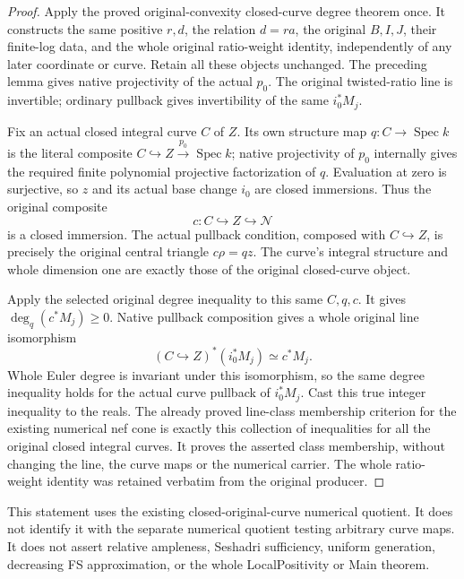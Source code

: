 \begin{proof}
Apply the proved original-convexity closed-curve degree theorem once.
It constructs the same positive $r,d$, the relation $d=ra$, the original
$B,I,J$, their finite-log data, and the whole original ratio-weight
identity, independently of any later coordinate or curve.  Retain all
these objects unchanged.  The preceding lemma gives native projectivity
of the actual $p_0$.  The original twisted-ratio line is invertible;
ordinary pullback gives invertibility of the same $i_0^*M_j$.

Fix an actual closed integral curve $C$ of $Z$.  Its own structure map
$q:C\to\operatorname{Spec}k$ is the literal composite $C\hookrightarrow
Z\xrightarrow{p_0}\operatorname{Spec}k$; native projectivity of $p_0$
internally gives the required finite polynomial projective factorization
of $q$.  Evaluation at zero is surjective, so $z$ and its actual base
change $i_0$ are closed immersions.  Thus the original composite
\[
 c:C\hookrightarrow Z\hookrightarrow\mathcal N
\]
is a closed immersion.  The actual pullback condition, composed with
$C\hookrightarrow Z$, is precisely the original central triangle
$c\rho=qz$.  The curve's integral structure and whole dimension one
are exactly those of the original closed-curve object.

Apply the selected original degree inequality to this same
$C,q,c$.  It gives $\deg_q(c^*M_j)\ge0$.  Native pullback composition
gives a whole original line isomorphism
\[
 (C\hookrightarrow Z)^*(i_0^*M_j)\simeq c^*M_j.
\]
Whole Euler degree is invariant under this isomorphism, so the same
degree inequality holds for the actual curve pullback of $i_0^*M_j$.
Cast this true integer inequality to the reals.  The already proved
line-class membership criterion for the existing numerical nef cone
is exactly this collection of inequalities for all the original closed
integral curves.  It proves the asserted class membership, without
changing the line, the curve maps or the numerical carrier.  The whole
ratio-weight identity was retained verbatim from the original producer.
\end{proof}

This statement uses the existing closed-original-curve numerical
quotient.  It does not identify it with the separate numerical quotient
testing arbitrary curve maps.  It does not assert relative ampleness,
Seshadri sufficiency, uniform generation, decreasing FS approximation,
or the whole LocalPositivity or Main theorem.
